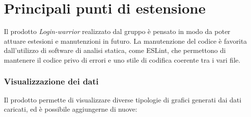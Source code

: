 \chapter{Principali punti di estensione}

Il prodotto \textit{Login-warrior} realizzato dal gruppo è pensato in modo da poter attuare estesioni e manutenzioni in futuro. La manutenzione del codice è favorita dall'utilizzo di software di analisi statica, come ESLint, che permettono di mantenere il codice privo di errori e uno stile di codifica coerente tra i vari file.

\subsection{Visualizzazione dei dati}
Il prodotto permette di visualizzare diverse tipologie di grafici generati dai dati caricati, ed è possibile aggiungerne di nuove:
